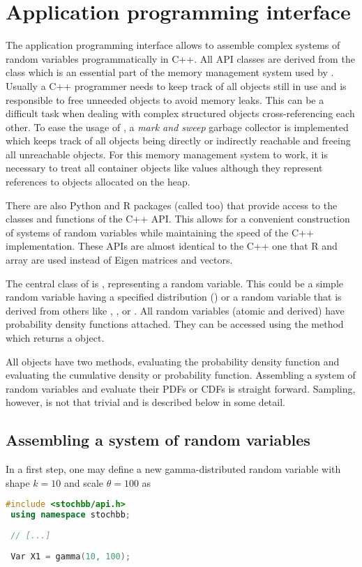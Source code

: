 \section{Application programming interface} \label{sec:api}
The application programming interface \cite[API, see also][]{stochbbapi} 
allows to assemble complex systems of random variables programmatically in C++.
All API classes are derived from the  class which is an essential part of the
memory management system used by . Usually a C++ programmer needs to keep track of all
objects still in use and is responsible to free unneeded objects to avoid memory leaks. This can
be a difficult task when dealing with complex structured objects cross-referencing each other.
To ease the usage of , a \emph{mark and sweep} garbage collector is implemented which keeps track
of all objects being directly or indirectly reachable and freeing all unreachable objects. For
this memory management system to work, it is necessary to treat all container objects like values
although they represent references to objects allocated on the heap.

There are also Python and R packages (called  too) that provide access to
the classes and functions of the C++ API. This allows for a convenient construction of systems
of random variables while maintaining the speed of the C++ implementation. These APIs are 
almost identical to the C++ one that R and  array are used instead of Eigen matrices
and vectors.

The central class of  is , representing a random variable. This could be a
simple random variable having a specified distribution () or a random
variable that is derived from others like , ,  or
. All random variables (atomic and derived) have probability density functions
attached. They can be accessed using the  method which returns a 
 object.

All  objects have two methods,  evaluating the probability
density function and  evaluating the cumulative density or probability
function. Assembling a system of random variables and evaluate their PDFs or CDFs is straight
forward. Sampling, however, is not that trivial and is described below in some detail.

\subsection{Assembling a system of random variables}
In a first step, one may define a new gamma-distributed random variable with shape $k=10$
and scale $\theta=100$ as
\begin{lstlisting}[language=C++]
 #include <stochbb/api.h>
 using namespace stochbb;
 
 // [...]
 
 Var X1 = gamma(10, 100);
\end{lstlisting}

